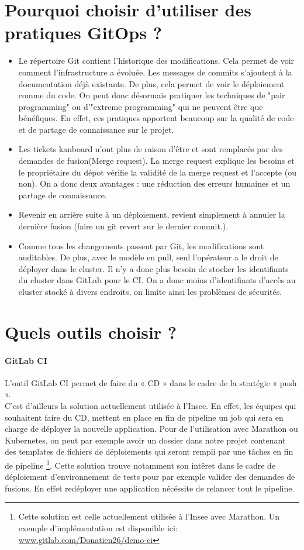 \documentclass[11pt,fleqn]{book} %
\begin{document}
\section{Pourquoi choisir d'utiliser des pratiques GitOps ? }
\begin{itemize}
    \item Le répertoire Git contient l'historique des modifications. Cela permet de voir comment l'infrastructure a évoluée. Les messages de commits s'ajoutent à la documentation déjà existante. De plus, cela permet de voir le déploiement comme du code. On peut donc désormais pratiquer les techniques de "pair programming" ou d'"extreme programming" qui ne peuvent être que bénéfiques. En effet, ces pratiques apportent beaucoup sur la qualité de code et de partage de connaissance sur le projet.
    \item Les tickets kanboard n'ont plus de raison d'être et sont remplacés par des demandes de fusion(Merge request). La merge request explique les besoins et le propriétaire du dépot vérifie la validité de la merge request et l'accepte (ou non). On a donc deux avantages :  une réduction des erreurs humaines et un partage de connaissance.
    \item Revenir en arrière suite à un déploiement, revient simplement à annuler la dernière fusion (faire un git revert sur le dernier commit.).
    \item Comme tous les changements passent par Git, les modifications sont auditables. De plus, avec le  modèle en pull, seul l’opérateur a le droit de déployer dans le cluster. Il n'y a donc plus besoin de stocker les identifiants du cluster dans GitLab pour le CI. On a donc moins d'identifiants d'accès au cluster stocké à divers endroits, on limite ainsi les problèmes de sécurités.
\end{itemize}




\section{Quels outils choisir ?}
\paragraph{GitLab CI}
L'outil GitLab CI permet de faire du « CD » dans le cadre de la stratégie « push ». \\

C’est d'ailleurs la solution actuellement utilisée à l'Insee. En effet, les équipes qui souhaitent faire du CD, mettent en place en fin de pipeline un job qui sera en charge de déployer la nouvelle application. Pour de l'utilisation avec Marathon ou Kubernetes, on peut par exemple avoir un dossier dans notre projet contenant des templates de fichiers de déploiements qui seront rempli par une tâches en fin de pipeline \footnote{Cette solution est celle actuellement utilisée à l'Insee avec Marathon. Un exemple d'implémentation est disponible ici: \url{www.gitlab.com/Donatien26/demo-ci}}. Cette solution trouve notamment son intêret dans le cadre de déploiement d'environnement de tests pour par exemple valider des demandes de fusions. En effet redéployer une application nécéssite de relancer tout le pipeline.\\
\end{document}
